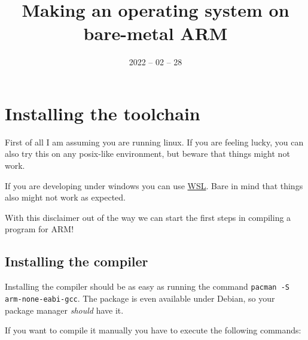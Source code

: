 \endofdump





\date{2022 -- 02 -- 28}
\title{Making an operating system on bare-metal ARM}
\useTemplate[english]

\usepackage[outputdir=out]{minted}

\def\shell#1{\texttt{#1}}



    \maketitle

    \section{Installing the toolchain}

    First of all I am assuming you are running linux.
    If you are feeling lucky, you can also try this on any posix-like environment, but beware that things might not work.

    If you are developing under windows you can use \href{https://docs.microsoft.com/en-us/windows/wsl/install}{WSL}.
    Bare in mind that things also might not work as expected.

    With this disclaimer out of the way we can start the first steps in compiling a program for ARM!

    \subsection{Installing the compiler}

    Installing the compiler should be as easy as running the command \shell{pacman -S arm-none-eabi-gcc}.
    The package is even available under Debian, so your package manager \textit{should} have it.

    If you want to compile it manually you have to execute the following commands:

    \begin{verbatim}

    \end{verbatim}

